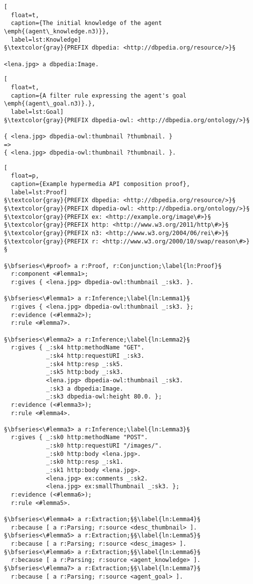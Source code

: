  \begin{lstlisting}[
  float=t,
  caption={The initial knowledge of the agent \emph{(agent\_knowledge.n3)}},
  label=lst:Knowledge]
§\textcolor{gray}{PREFIX dbpedia: <http://dbpedia.org/resource/>}§

<lena.jpg> a dbpedia:Image.
\end{lstlisting}

\begin{lstlisting}[
  float=t,
  caption={A filter rule expressing the agent's goal \emph{(agent\_goal.n3)}.},
  label=lst:Goal]
§\textcolor{gray}{PREFIX dbpedia-owl: <http://dbpedia.org/ontology/>}§

{ <lena.jpg> dbpedia-owl:thumbnail ?thumbnail. }
=>
{ <lena.jpg> dbpedia-owl:thumbnail ?thumbnail. }.
\end{lstlisting}

\begin{lstlisting}[
  float=p,
  caption={Example hypermedia API composition proof},
  label=lst:Proof]
§\textcolor{gray}{PREFIX dbpedia: <http://dbpedia.org/resource/>}§
§\textcolor{gray}{PREFIX dbpedia-owl: <http://dbpedia.org/ontology/>}§
§\textcolor{gray}{PREFIX ex: <http://example.org/image\#>}§
§\textcolor{gray}{PREFIX http: <http://www.w3.org/2011/http\#>}§
§\textcolor{gray}{PREFIX n3: <http://www.w3.org/2004/06/rei\#>}§
§\textcolor{gray}{PREFIX r: <http://www.w3.org/2000/10/swap/reason\#>}§

§\bfseries<\#proof> a r:Proof, r:Conjunction;\label{ln:Proof}§
  r:component <#lemma1>;
  r:gives { <lena.jpg> dbpedia-owl:thumbnail _:sk3. }.

§\bfseries<\#lemma1> a r:Inference;\label{ln:Lemma1}§
  r:gives { <lena.jpg> dbpedia-owl:thumbnail _:sk3. };
  r:evidence (<#lemma2>);
  r:rule <#lemma7>.
  
§\bfseries<\#lemma2> a r:Inference;\label{ln:Lemma2}§
  r:gives { _:sk4 http:methodName "GET".
            _:sk4 http:requestURI _:sk3.
            _:sk4 http:resp _:sk5.
            _:sk5 http:body _:sk3.
            <lena.jpg> dbpedia-owl:thumbnail _:sk3.
            _:sk3 a dbpedia:Image.
            _:sk3 dbpedia-owl:height 80.0. };
  r:evidence (<#lemma3>);
  r:rule <#lemma4>.
  
§\bfseries<\#lemma3> a r:Inference;\label{ln:Lemma3}§
  r:gives { _:sk0 http:methodName "POST".
            _:sk0 http:requestURI "/images/".
            _:sk0 http:body <lena.jpg>.
            _:sk0 http:resp _:sk1.
            _:sk1 http:body <lena.jpg>.
            <lena.jpg> ex:comments _:sk2.
            <lena.jpg> ex:smallThumbnail _:sk3. };  
  r:evidence (<#lemma6>);
  r:rule <#lemma5>.
  
§\bfseries<\#lemma4> a r:Extraction;§§\label{ln:Lemma4}§ 
  r:because [ a r:Parsing; r:source <desc_thumbnail> ].
§\bfseries<\#lemma5> a r:Extraction;§§\label{ln:Lemma5}§
  r:because [ a r:Parsing; r:source <desc_images> ].
§\bfseries<\#lemma6> a r:Extraction;§§\label{ln:Lemma6}§ 
  r:because [ a r:Parsing; r:source <agent_knowledge> ].
§\bfseries<\#lemma7> a r:Extraction;§§\label{ln:Lemma7}§
  r:because [ a r:Parsing; r:source <agent_goal> ].
\end{lstlisting}


